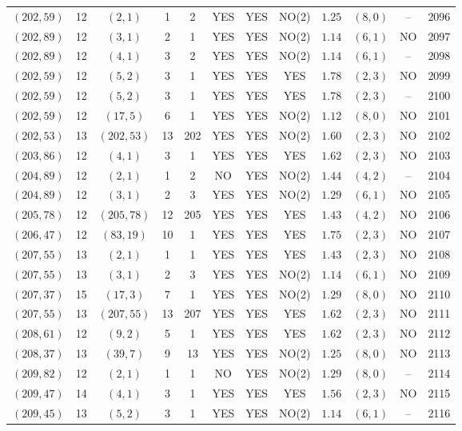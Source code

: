 \begin{longtable}{|c|c|c|c|c|c|c|c|c|c|c|c|}
$(202,59)$ & 12 & $(2,1)$ & 1 & 2 & YES & YES & NO(2) & $1.25$ & $(8,0)$ & -- & 2096\\
$(202,89)$ & 12 & $(3,1)$ & 2 & 1 & YES & YES & NO(2) & $1.14$ & $(6,1)$ & NO & 2097\\
$(202,89)$ & 12 & $(4,1)$ & 3 & 2 & YES & YES & NO(2) & $1.14$ & $(6,1)$ & -- & 2098\\
$(202,59)$ & 12 & $(5,2)$ & 3 & 1 & YES & YES & YES & $1.78$ & $(2,3)$ & NO & 2099\\
$(202,59)$ & 12 & $(5,2)$ & 3 & 1 & YES & YES & YES & $1.78$ & $(2,3)$ & -- & 2100\\
$(202,59)$ & 12 & $(17,5)$ & 6 & 1 & YES & YES & NO(2) & $1.12$ & $(8,0)$ & NO & 2101\\
$(202,53)$ & 13 & $(202,53)$ & 13 & 202 & YES & YES & NO(2) & $1.60$ & $(2,3)$ & NO & 2102\\
$(203,86)$ & 12 & $(4,1)$ & 3 & 1 & YES & YES & YES & $1.62$ & $(2,3)$ & NO & 2103\\
$(204,89)$ & 12 & $(2,1)$ & 1 & 2 & NO & YES & NO(2) & $1.44$ & $(4,2)$ & -- & 2104\\
$(204,89)$ & 12 & $(3,1)$ & 2 & 3 & YES & YES & NO(2) & $1.29$ & $(6,1)$ & NO & 2105\\
$(205,78)$ & 12 & $(205,78)$ & 12 & 205 & YES & YES & YES & $1.43$ & $(4,2)$ & NO & 2106\\
$(206,47)$ & 12 & $(83,19)$ & 10 & 1 & YES & YES & YES & $1.75$ & $(2,3)$ & NO & 2107\\
$(207,55)$ & 13 & $(2,1)$ & 1 & 1 & YES & YES & YES & $1.43$ & $(2,3)$ & NO & 2108\\
$(207,55)$ & 13 & $(3,1)$ & 2 & 3 & YES & YES & NO(2) & $1.14$ & $(6,1)$ & NO & 2109\\
$(207,37)$ & 15 & $(17,3)$ & 7 & 1 & YES & YES & NO(2) & $1.29$ & $(8,0)$ & NO & 2110\\
$(207,55)$ & 13 & $(207,55)$ & 13 & 207 & YES & YES & YES & $1.62$ & $(2,3)$ & NO & 2111\\
$(208,61)$ & 12 & $(9,2)$ & 5 & 1 & YES & YES & YES & $1.62$ & $(2,3)$ & NO & 2112\\
$(208,37)$ & 13 & $(39,7)$ & 9 & 13 & YES & YES & NO(2) & $1.25$ & $(8,0)$ & NO & 2113\\
$(209,82)$ & 12 & $(2,1)$ & 1 & 1 & NO & YES & NO(2) & $1.29$ & $(8,0)$ & -- & 2114\\
$(209,47)$ & 14 & $(4,1)$ & 3 & 1 & YES & YES & YES & $1.56$ & $(2,3)$ & NO & 2115\\
$(209,45)$ & 13 & $(5,2)$ & 3 & 1 & YES & YES & NO(2) & $1.14$ & $(6,1)$ & -- & 2116\\

\end{longtable}
